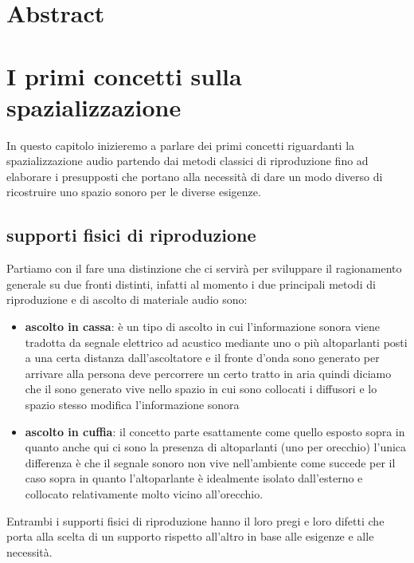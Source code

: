 \documentclass[12pt,a4paper]{report}
\begin{document}
\tableofcontents

\listoffigures



\chapter*{Abstract}





\chapter{I primi concetti sulla spazializzazione}

In questo capitolo inizieremo a parlare dei primi concetti riguardanti la spazializzazione audio partendo dai metodi classici di riproduzione fino ad elaborare i presupposti che portano alla necessità di dare un modo diverso di ricostruire uno spazio sonoro per le diverse esigenze.

\section{supporti fisici di riproduzione}

Partiamo con il fare una distinzione che ci servirà per sviluppare il ragionamento generale su due fronti distinti, infatti al momento i due principali metodi di riproduzione e di ascolto di materiale audio sono:

\begin{itemize}
\item \textbf{ascolto in cassa}: è un tipo di ascolto in cui l'informazione sonora viene tradotta da segnale elettrico ad acustico mediante uno o più altoparlanti posti a una certa distanza dall'ascoltatore e il fronte d'onda sono generato per arrivare alla persona deve percorrere un certo tratto in aria quindi diciamo che il sono generato vive nello spazio in cui sono collocati i diffusori e lo spazio stesso modifica l'informazione sonora
\item \textbf{ascolto in cuffia}: il concetto parte esattamente come quello esposto sopra in quanto anche qui ci sono la presenza di altoparlanti (uno per orecchio) l'unica differenza è che il segnale sonoro non vive nell'ambiente come succede per il caso sopra in quanto l'altoparlante è idealmente isolato dall'esterno e collocato relativamente molto vicino all'orecchio.



\end{itemize}
Entrambi i supporti fisici di riproduzione hanno il loro pregi e loro difetti che porta alla scelta di un supporto rispetto all'altro in base alle esigenze e alle necessità.
\end{document}
